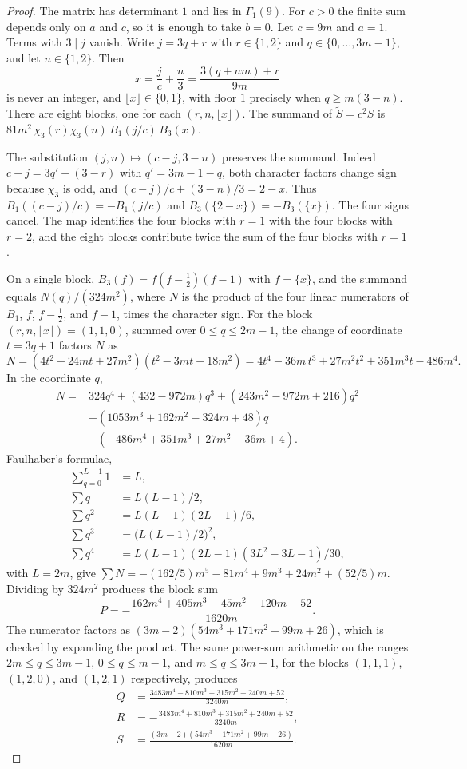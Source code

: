 \documentclass[11pt]{article}
\theoremstyle{remark}
\newcommand{\tS}{\widetilde{S}}
\begin{document}
\begin{proof}
The matrix has determinant \(1\) and lies in \(\Gamma_1(9)\).
For \(c>0\) the finite sum depends only on \(a\) and \(c\), so it is enough to take \(b=0\).
Let \(c=9m\) and \(a=1\).
Terms with \(3\mid j\) vanish.
Write \(j=3q+r\) with \(r\in\{1,2\}\) and \(q\in\{0,\ldots,3m-1\}\), and let \(n\in\{1,2\}\).
Then
\[
x=\frac{j}{c}+\frac{n}{3}=\frac{3(q+nm)+r}{9m}
\]
is never an integer, and \(\lfloor x\rfloor\in\{0,1\}\), with floor \(1\) precisely when \(q\ge m(3-n)\).
There are eight blocks, one for each \((r,n,\lfloor x\rfloor)\).
The summand of \(\tS=c^2 S\) is \(81m^2\,\chi_3(r)\chi_3(n)\,B_1(j/c)\,B_3(x)\).

The substitution \((j,n)\mapsto(c-j,3-n)\) preserves the summand.
Indeed \(c-j=3q'+(3-r)\) with \(q'=3m-1-q\), both character factors change sign because \(\chi_3\) is odd, and \((c-j)/c+(3-n)/3=2-x\).
Thus \(B_1((c-j)/c)=-B_1(j/c)\) and \(B_3(\{2-x\})=-B_3(\{x\})\).
The four signs cancel.
The map identifies the four blocks with \(r=1\) with the four blocks with \(r=2\), and the eight blocks contribute twice the sum of the four blocks with \(r=1\).

On a single block, \(B_3(f)=f(f-\tfrac12)(f-1)\) with \(f=\{x\}\), and the summand equals \(N(q)/(324m^2)\), where \(N\) is the product of the four linear numerators of \(B_1\), \(f\), \(f-\tfrac12\), and \(f-1\), times the character sign.
For the block \((r,n,\lfloor x\rfloor)=(1,1,0)\), summed over \(0\le q\le 2m-1\), the change of coordinate \(t=3q+1\) factors \(N\) as
\[
N=(4t^2-24mt+27m^2)(t^2-3mt-18m^2)
=4t^4-36m\,t^3+27m^2 t^2+351 m^3 t-486 m^4.
\]
In the coordinate \(q\),
\begin{align*}
N={}&324q^4+(432-972m)q^3+(243m^2-972m+216)q^2\\
&+(1053m^3+162m^2-324m+48)q\\
&+(-486m^4+351m^3+27m^2-36m+4).
\end{align*}
Faulhaber's formulae,
\begin{align*}
\sum_{q=0}^{L-1}1&=L,\\
\sum q&=L(L-1)/2,\\
\sum q^2&=L(L-1)(2L-1)/6,\\
\sum q^3&=\bigl(L(L-1)/2\bigr)^2,\\
\sum q^4&=L(L-1)(2L-1)(3L^2-3L-1)/30,
\end{align*}
with \(L=2m\), give \(\sum N=-(162/5)m^5-81m^4+9m^3+24m^2+(52/5)m\).
Dividing by \(324m^2\) produces the block sum
\[
P=-\frac{162m^4+405m^3-45m^2-120m-52}{1620m}.
\]
The numerator factors as \((3m-2)(54m^3+171m^2+99m+26)\), which is checked by expanding the product.
The same power-sum arithmetic on the ranges \(2m\le q\le 3m-1\), \(0\le q\le m-1\), and \(m\le q\le 3m-1\), for the blocks \((1,1,1)\), \((1,2,0)\), and \((1,2,1)\) respectively, produces
\begin{align*}
Q&=\frac{3483m^4-810m^3+315m^2-240m+52}{3240m},\\
R&=-\frac{3483m^4+810m^3+315m^2+240m+52}{3240m},\\
S&=\frac{(3m+2)(54m^3-171m^2+99m-26)}{1620m}.
\end{align*}


\end{proof}
\end{document}
